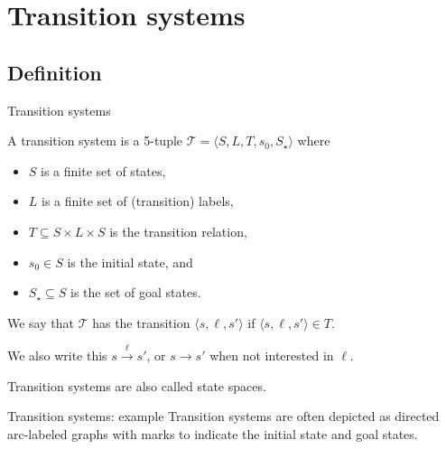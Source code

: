 \documentclass{gkibeamer}
\begin{document}
\subtitle{Transition systems and planning tasks}
\date{October 25th, 2011}
\maketitles

\section{Transition systems}
\subsection{Definition}

\begin{frame}{Transition systems}
  \begin{definition}
    A \alert{transition system} is a 5-tuple $\mathcal T = \langle S,
    L, T, s_0, S_\star\rangle$ where
    \begin{itemize}
    \item $S$ is a finite set of \alert{states},
    \item $L$ is a finite set of (transition) \alert{labels},
    \item $T \subseteq S \times L \times S$ is the \alert{transition
      relation},
    \item $s_0 \in S$ is the \alert{initial state}, and
    \item $S_\star \subseteq S$ is the set of \alert{goal states}.
    \end{itemize}
    We say that $\mathcal T$ \alert{has the transition} $\langle s, \ell,
    s'\rangle$ if $\langle s, \ell, s'\rangle \in T$.

    We also write this \alert{$s \xrightarrow{\ell} s'$}, or \alert{$s
      \rightarrow s'$} when not interested in $\ell$.
  \end{definition}

  Transition systems are also called \alert{state spaces}.
\end{frame}

\begin{frame}{Transition systems: example}
  Transition systems are often depicted as \alert{directed arc-labeled
    graphs} with marks to indicate the initial state and goal states.
  \begin{center}
    
  \end{center}
\end{frame}
\end{document}
